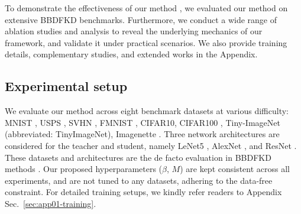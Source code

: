 \begin{foldable} %
    To demonstrate the effectiveness of our method \methodname, we evaluated our method on extensive BBDFKD benchmarks.
    Furthermore, we conduct a wide range of ablation studies and analysis to reveal the underlying mechanics of our framework, and validate it under practical scenarios.
    We also provide training details, complementary studies, and extended works in the Appendix.
\end{foldable}

\subsection{Experimental setup} \label{ssec:04-experiments-setup}
\begin{foldable} %
    We evaluate our method across eight benchmark datasets at various difficulty: MNIST \citep{lecun2002gradient}, USPS \citep{hull1994database}, SVHN \citep{netzer2011reading}, FMNIST \citep{xiao2017fashion}, CIFAR10, CIFAR100 \citep{krizhevsky2009learning}, Tiny-ImageNet \citep{le2015tiny} (abbreviated: TinyImageNet), Imagenette \citep{howard2020imagenette}.
    Three network architectures are considered for the teacher and student, namely LeNet5 \citep{lecun2002gradient}, AlexNet \citep{krizhevsky2012imagenet}, and ResNet \citep{he2016deep}.
    These datasets and architectures are the de facto evaluation in BBDFKD methods \citep{wang2021zero, zhang2022ideal, yuan2024data}.
    Our proposed hyperparameters ($\beta$, $M$) are kept consistent across all experiments, and are not tuned to any datasets, adhering to the data-free constraint.
    For detailed training setups, we kindly refer readers to Appendix Sec.~\ref{sec:app01-training}.
\end{foldable}


